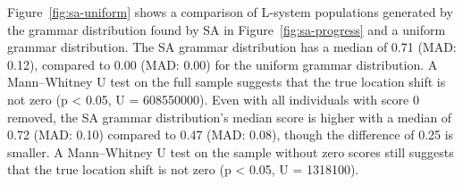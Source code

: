 Figure~\ref{fig:sa-uniform} shows a comparison of L-system populations generated by the grammar distribution found by SA in Figure~\ref{fig:sa-progress} and a uniform grammar distribution.
The SA grammar distribution has a median of 0.71 (MAD: 0.12), compared to 0.00 (MAD: 0.00) for the uniform grammar distribution.
A Mann–Whitney U test on the full sample suggests that the true location shift is not zero (p < 0.05, U = 608550000).
Even with all individuals with score 0 removed, the SA grammar distribution's median score is higher with a median of 0.72 (MAD: 0.10) compared to 0.47 (MAD: 0.08), though the difference of 0.25 is smaller.
A Mann–Whitney U test on the sample without zero scores still suggests that the true location shift is not zero (p < 0.05, U = 1318100).

